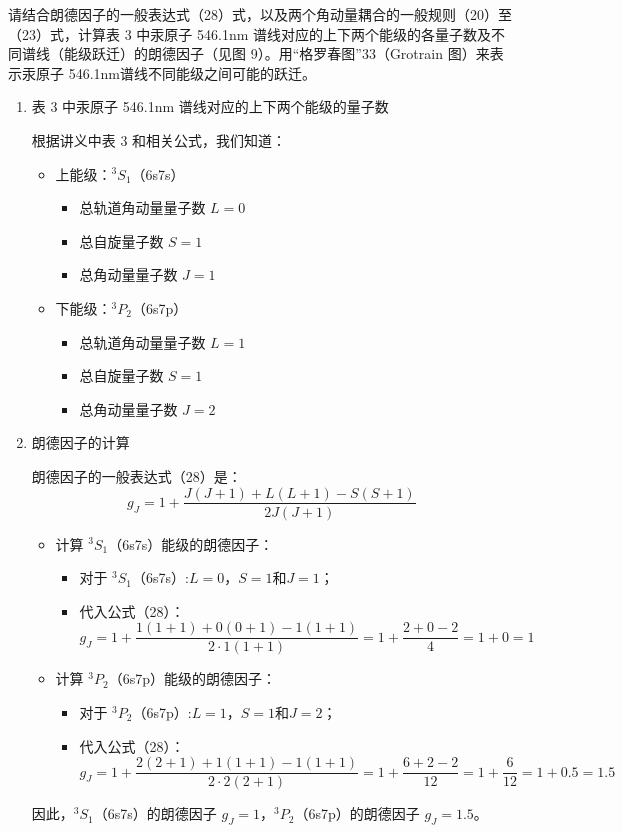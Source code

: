 \documentclass[dvipsnames, svgnames,a4paper,11pt]{article}
\begin{document}
	
	\begin{question}
		请结合朗德因子的一般表达式（28）式，以及两个角动量耦合的一般规则（20）至（23）式，计算表 3 中汞原子 546.1nm 谱线对应的上下两个能级的各量子数及不同谱线（能级跃迁）的朗德因子（见图 9）。用“格罗春图”33（Grotrain 图）来表示汞原子 546.1nm谱线不同能级之间可能的跃迁。
	\end{question}
	\begin{enumerate}
		\item 表 3 中汞原子 546.1nm 谱线对应的上下两个能级的量子数
		
		根据讲义中表 3 和相关公式，我们知道：
		\begin{itemize}
			\item 上能级：$^3S_1$（6s7s）
			\begin{itemize}
				\item 总轨道角动量量子数 \(L = 0\)
				\item 总自旋量子数 \(S = 1\)
				\item 总角动量量子数 \(J = 1\)
			\end{itemize}
			\item 下能级：$^3P_2$（6s7p）
			\begin{itemize}
				\item 总轨道角动量量子数 \(L = 1\)
				\item 总自旋量子数 \(S = 1\)
				\item 总角动量量子数 \(J = 2\)
			\end{itemize}
		\end{itemize}
		
		\item 朗德因子的计算
		
		朗德因子的一般表达式（28）是：
		\[
		g_J = 1 + \frac{J(J+1) + L(L+1) - S(S+1)}{2J(J+1)}
		\]
		
		\begin{itemize}
			\item 计算 $^3S_1$（6s7s）能级的朗德因子：
			\begin{itemize}
				\item 对于 $^3S_1$（6s7s）:\(L = 0\)，\(S = 1\)和\(J = 1\)；
				\item 代入公式（28）：
				\[
				g_J = 1 + \frac{1(1+1) + 0(0+1) - 1(1+1)}{2 \cdot 1(1+1)} = 1 + \frac{2 + 0 - 2}{4} = 1 + 0 = 1
				\]
			\end{itemize}
			
			\item 计算 $^3P_2$（6s7p）能级的朗德因子：
			\begin{itemize}
				\item 对于 $^3P_2$（6s7p）:\(L = 1\)，\(S = 1\)和\(J = 2\)；
				\item 代入公式（28）：
				\[
				g_J = 1 + \frac{2(2+1) + 1(1+1) - 1(1+1)}{2 \cdot 2(2+1)} = 1 + \frac{6 + 2 - 2}{12} = 1 + \frac{6}{12} = 1 + 0.5 = 1.5
				\]
			\end{itemize}
		\end{itemize}
		
		因此，$^3S_1$（6s7s）的朗德因子 \(g_J = 1\)，$^3P_2$（6s7p）的朗德因子 \(g_J = 1.5\)。
	\end{enumerate}
	
\end{document}
